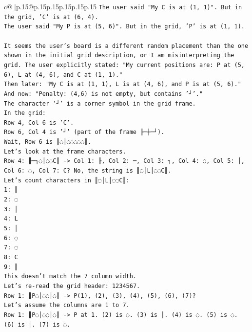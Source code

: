 \documentclass{article}
\begin{document}
{\begin{supertabular}{c@{$\;$}|p{.15\linewidth}@{}p{.15\linewidth}p{.15\linewidth}p{.15\linewidth}p{.15\linewidth}p{.15\linewidth}}
{{{\texttt{The user said "My C is at (1, 1)". But in the grid, 'C' is at (6, 4).} \\
\texttt{The user said "My P is at (5, 6)". But in the grid, 'P' is at (1, 1).} \\
\\ 
\texttt{It seems the user's board is a different random placement than the one shown in the initial grid description, or I am misinterpreting the grid. The user explicitly stated: "My current positions are: P at (5, 6), L at (4, 6), and C at (1, 1)."} \\
\texttt{Then later: "My C is at (1, 1), L is at (4, 6), and P is at (5, 6)."} \\
\texttt{And now: "Penalty: (4,6) is not empty, but contains '┘'."} \\
\texttt{The character '┘' is a corner symbol in the grid frame.} \\
\texttt{In the grid:} \\
\texttt{Row 4, Col 6 is 'C'.} \\
\texttt{Row 6, Col 4 is '┘' (part of the frame ╟─┼─┘).} \\
\texttt{Wait, Row 6 is ║◌│◌◌◌◌◌║.} \\
\texttt{Let's look at the frame characters.} \\
\texttt{Row 4: ╟─┐◌│◌◌C║ {-}> Col 1: ╟, Col 2: ─, Col 3: ┐, Col 4: ◌, Col 5: │, Col 6: ◌, Col 7: C? No, the string is ║◌│L│◌◌C║.} \\
\texttt{Let's count characters in ║◌│L│◌◌C║:} \\
\texttt{1: ║} \\
\texttt{2: ◌} \\
\texttt{3: │} \\
\texttt{4: L} \\
\texttt{5: │} \\
\texttt{6: ◌} \\
\texttt{7: ◌} \\
\texttt{8: C} \\
\texttt{9: ║} \\
\texttt{This doesn't match the 7 column width.} \\
\texttt{Let's re{-}read the grid header: 1234567.} \\
\texttt{Row 1: ║P◌│◌◌│◌║ {-}> P(1), (2), (3), (4), (5), (6), (7)?} \\
\texttt{Let's assume the columns are 1 to 7.} \\
\texttt{Row 1: ║P◌│◌◌│◌║ {-}> P at 1. (2) is ◌. (3) is │. (4) is ◌. (5) is ◌. (6) is │. (7) is ◌.} \\
}}}
\end{supertabular}}
\end{document}
